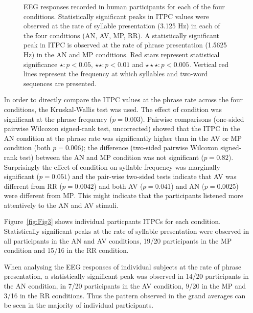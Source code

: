 \documentclass[10pt,letterpaper]{article}
\begin{document}
\begin{figure}[tbhp]

\caption{EEG responses recorded in human participants for each of the
  four conditions. Statistically significant peaks in ITPC values were
  observed at the rate of syllable presentation (3.125 Hz) in each of
  the four conditions (AN, AV, MP, RR). A statistically significant
  peak in ITPC is observed at the rate of phrase presentation (1.5625
  Hz) in the AN and MP conditions. Red stars
  represent statistical significance $\star: p<0.05$, $\star\star: p<0.01$ and
  $\star\star\star: p<0.005$. Vertical red lines represent the
  frequency at which syllables and two-word sequences are presented.}
\label{fig:Fig2}
\end{figure}

In order to directly compare the ITPC values at the phrase rate across
the four conditions, the Kruskal-Wallis test was used. The effect of
condition was significant at the phrase frequency
($p=0.003$). Pairwise comparisons (one-sided pairwise Wilcoxon
signed-rank test, uncorrected) showed that the ITPC in the AN
condition at the phrase rate was significantly higher than in the AV
or MP condition (both $p=0.006$); the difference (two-sided pairwise
Wilcoxon signed-rank test) between the AN and MP condition was not
significant ($p=0.82$). Surprisingly the effect of condition on
syllable frequency was marginally significant ($p=0.051$) and the
pair-wise two-sided tests indicate that AV was different from RR
($p=0.0042$) and both AV ($p=0.041$) and AN ($p=0.0025$) were
different from MP. This might indicate that the participants listened
more attentively to the AN and AV stimuli.


Figure~\ref{fig:Fig3} shows individual particpants ITPCs for each
condition. Statistically significant peaks at the rate of syllable
presentation were observed in all participants in the AN and AV
conditions, 19/20 participants in the MP condition and 15/16 in the RR
condition.

When analysing the EEG responses of individual subjects at the rate of
phrase presentation, a statistically significant peak was observed in
14/20 participants in the AN condition, in 7/20 participants in the AV
condition, 9/20 in the MP and 3/16 in the RR conditions. Thus the
pattern observed in the grand averages can be seen in the majority of
individual participants.
\end{document}
